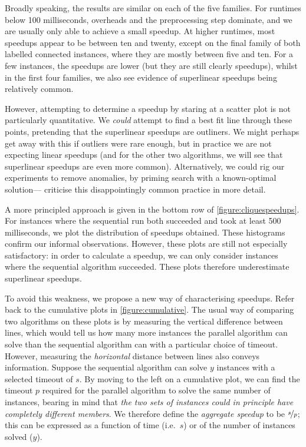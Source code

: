 \documentclass[sigconf]{acmart}
\begin{document}
Broadly speaking, the results are similar on each of the five families. For runtimes below 100
milliseconds, overheads and the preprocessing step dominate, and we are usually only able to achieve
a small speedup. At higher runtimes, most speedups appear to be between ten and twenty, except on
the final family of both labelled connected instances, where they are mostly between five and ten.
For a few instances, the speedups are lower (but they are still clearly speedups), whilst in the
first four families, we also see evidence of superlinear speedups being relatively common.

However, attempting to determine a speedup by staring at a scatter plot is not particularly
quantitative. We \emph{could} attempt to find a best fit line through these points, pretending that
the superlinear speedups are outliners. We might perhaps get away with this if outliers were rare
enough, but in practice we are not expecting linear speedups (and for the other two algorithms, we
will see that superlinear speedups are even more common). Alternatively, we could rig our
experiments to remove anomalies, by priming search with a known-optimal
solution---\citet{DBLP:journals/topc/McCreeshP15} criticise this disappointingly common practice in
more detail.

A more principled approach is given in the bottom row of \cref{figure:cliquespeedups}. For instances
where the sequential run both succeeded and took at least 500 milliseconds, we plot the distribution
of speedups obtained. These histograms confirm our informal observations. However, these plots are
still not especially satisfactory: in order to calculate a speedup, we can only consider instances
where the sequential algorithm succeeded. These plots therefore underestimate superlinear speedups.

To avoid this weakness, we propose a new way of characterising speedups. Refer back to the
cumulative plots in \cref{figure:cumulative}. The usual way of comparing two algorithms on these
plots is by measuring the vertical difference between lines, which would tell us how many more
instances the parallel algorithm can solve than the sequential algorithm can with a particular
choice of timeout.  However, measuring the \emph{horizontal} distance between lines also conveys
information. Suppose the sequential algorithm can solve $y$ instances with a selected timeout of
$s$. By moving to the left on a cumulative plot, we can find the timeout $p$ required for the
parallel algorithm to solve the same number of instances, bearing in mind that \emph{the two sets of
instances could in principle have completely different members}. We therefore define the
\emph{aggregate speedup} to be $\nicefrac{s}{p}$; this can be expressed as a function of time (i.e.\
$s$) or of the number of instances solved ($y$).
\end{document}
